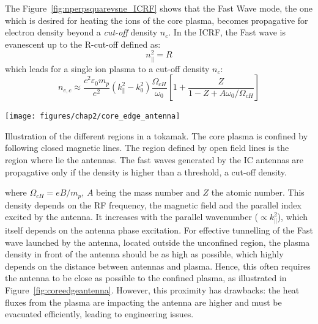 The Figure~\ref{fig:nperpsquarevsne_ICRF} shows that the Fast Wave mode, the one which is desired for heating the ions of the core plasma, becomes propagative for electron density beyond a \textit{cut-off} density $n_{c}$. In the ICRF, the Fast wave is evanescent up to the R-cut-off defined as: 
\begin{equation}
n_\parallel^2 = R
\end{equation}
which leads for a single ion plasma to a cut-off density $n_c$: 
\begin{equation}
	n_{e,c}
	\approx
	\frac{c^2 \varepsilon_{0} m_p}{e^2}
	\left(k_\parallel^2 - k_0^2 \right)
	\frac{\Omega_{cH}}{\omega_0}
	\left[1 + \frac{Z}{1-Z+A\omega_0/\Omega_{cH}}\right]
\end{equation}
\begin{marginfigure}
	\centering
	\texttt{[image: figures/chap2/core\_edge\_antenna]}
	\caption{Illustration of the different regions in a tokamak. The core plasma is confined by following closed magnetic lines. The region defined by open field lines is the region where lie the antennas. The fast waves generated by the IC antennas are propagative only if the density is higher than a threshold, a cut-off density.}
	\label{fig:coreedgeantenna}
\end{marginfigure}
where $\Omega_{cH} = eB/m_p$, $A$ being the mass number and $Z$ the atomic number. This density depends on the RF frequency, the magnetic field and the parallel index excited by the antenna. It increases with the parallel wavenumber ($\propto k_\parallel^2$), which itself depends on the antenna phase excitation. For effective tunnelling of the Fast wave launched by the antenna, located outside the unconfined region, the plasma density in front of the antenna should be as high as possible, which highly depends on the distance between antennas and plasma. Hence, this often requires the antenna to be close as possible to the confined plasma, as illustrated in Figure~\ref{fig:coreedgeantenna}. However, this proximity has drawbacks: the heat fluxes from the plasma are impacting the antenna are higher and must be evacuated efficiently, leading to engineering issues.


